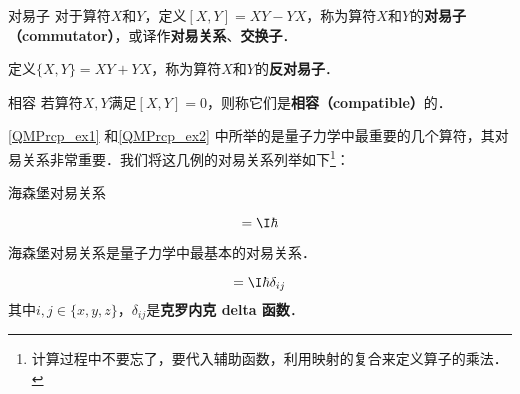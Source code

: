\begin{definition}{对易子}\label{QMPrcp_def13}
对于算符$X$和$Y$，定义$[X, Y]=XY-YX$，称为算符$X$和$Y$的\textbf{对易子（commutator）}，或译作\textbf{对易关系}、\textbf{交换子}．

定义$\{X, Y\}=XY+YX$，称为算符$X$和$Y$的\textbf{反对易子}．
\end{definition}


\begin{definition}{相容}\label{QMPrcp_def17}
若算符$X, Y$满足$[X, Y]=0$，则称它们是\textbf{相容（compatible）}的．
\end{definition}

\autoref{QMPrcp_ex1} 和\autoref{QMPrcp_ex2} 中所举的是量子力学中最重要的几个算符，其对易关系非常重要．我们将这几例的对易关系列举如下\footnote{计算过程中不要忘了，要代入辅助函数，利用映射的复合来定义算子的乘法．}：

\begin{theorem}{海森堡对易关系}\label{QMPrcp_the5}

\begin{equation}
[\hat{x}, \hat{p}_x] = \I\hbar
\end{equation}

\end{theorem}



海森堡对易关系是量子力学中最基本的对易关系．



\begin{corollary}{}\label{QMPrcp_cor1}

\begin{equation}
[\hat{i}, \hat{p}_j]=\I\hbar\delta_{ij}
\end{equation}
其中$i, j\in\{x, y, z\}$，$\delta_{ij}$是\textbf{克罗内克 delta 函数}．
\end{corollary}

